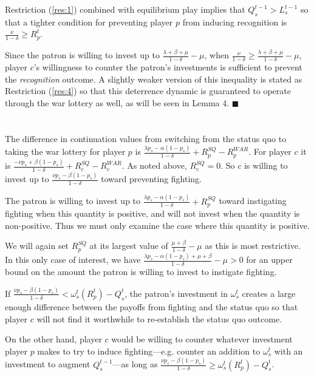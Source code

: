 \documentclass[11pt,letterpaper, notitlepage]{article}
\newcommand{\de}{\delta}
\begin{document}
Restriction (\ref{res:1}) combined with equilibrium play implies that  $Q_s^{t-1} > L_s^{t-1}$ so that a tighter condition for preventing player $p$ from inducing recognition is $\frac{\nu}{1 -\de} \geq R_p^t$. 

Since the patron is willing to invest up to $\frac{\lambda + \beta + \mu}{1 -\de} -\mu$, when $\frac{\nu}{1 -\de} \geq \frac{\lambda + \beta + \mu}{1 -\de} -\mu$, player $c$'s willingness to counter the patron's investments is sufficient to prevent the \emph{recognition} outcome. A slightly weaker version of this inequality is stated as Restriction (\ref{res:4}) so that this deterrence dynamic is guaranteed to operate through the war lottery as well, as will be seen in Lemma 4. \hfill $\blacksquare$
\\
\\
 \\
The difference in continuation values from switching from the status quo to taking the war lottery for player $p$ is $\frac{\lambda p_s - \alpha (1-p_s)}{1 -\de} +R_p^{SQ} -R_p^{WAR}$. For player $c$ it is $\frac{-\nu p_s + \beta (1-p_s)}{1 -\de} + R_c^{SQ} -R_c^{WAR}$. As noted above, $R_c^{SQ} =0$. So $c$ is willing to invest up to $\frac{\nu p_s - \beta (1-p_s)}{1 -\de}$ toward preventing fighting.

The patron is willing to invest up to $\frac{\lambda p_s - \alpha (1-p_s)}{1 -\de} +R_p^{SQ}$ toward instigating fighting when this quantity is positive, and will not invest when the quantity is non-positive. Thus we must only examine the case where this quantity is positive.

We will again set $R_p^{SQ}$ at its largest value of $\frac{\mu + \beta}{1-\de} -\mu$ as this is most restrictive. In this only case of interest, we have $\frac{\lambda p_s - \alpha (1-p_s) + \mu + \beta}{1 - \de} -\mu> 0$ for an upper bound on the amount the patron is willing to invest to instigate fighting.

If $\frac{\nu p_s - \beta (1-p_s)}{1 -\de}  < \omega_s^t\left(R_p^t\right) - Q_s^t$, the patron's investment in $\omega_s^t$ creates a large enough difference between the payoffs from fighting and the status quo so that player $c$ will not find it worthwhile to re-establish the status quo outcome.

On the other hand, player $c$ would be willing to counter whatever investment player $p$ makes to try to induce fighting---e.g. counter an addition to $\omega_s^t$ with an investment to augment $Q_s^{t-1}$---as long as $\frac{\nu p_s - \beta (1-p_s)}{1 -\de}  \geq \omega_s^t\left(R_p^t\right) - Q_s^t$.
\end{document}
